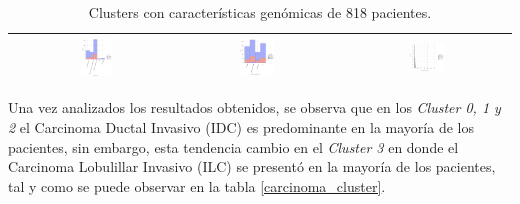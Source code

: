 \begin{table}
\begin{center}
\begin{tabular}{ |c|c|c|c| }
			& \includegraphics[width=0.22\textwidth]{NOTEBOOK/IMAGENES_BIRCH_DESCRIPTIVAS/38} 
			& \includegraphics[width=0.22\textwidth]{NOTEBOOK/IMAGENES_BIRCH_DESCRIPTIVAS/39} 
			& \includegraphics[width=0.22\textwidth]{NOTEBOOK/IMAGENES_BIRCH_DESCRIPTIVAS/40} 
			\\  \hline                  
		\end{tabular} 
		\caption{Clusters con características genómicas de 818 pacientes.}
		\label{clusters}
	\end{center} 
\end{table}
\break
Una vez analizados los resultados obtenidos, se observa que en los \textit {Cluster 0, 1 y 2} el Carcinoma Ductal Invasivo (IDC) es predominante en la mayoría de los pacientes, sin embargo, esta tendencia cambio en el \textit{Cluster 3} en donde el Carcinoma Lobulillar Invasivo (ILC) se presentó en la mayoría de los pacientes, tal y como se puede observar en la tabla \ref{carcinoma_cluster}. 
